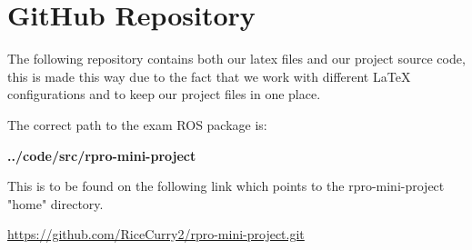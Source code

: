 \chapter{GitHub Repository}

The following repository contains both our latex files and our project source code, this is made this way due to the fact that we work with different LaTeX configurations and to keep our project files in one place.

\vspace{2mm}

The correct path to the exam ROS package is:

\vspace{2mm}

\textbf{../code/src/rpro-mini-project}

\vspace{8mm}

This is to be found on the following link which points to the rpro-mini-project "home" directory.

\vspace{4mm}

\href{https://github.com/RiceCurry2/rpro-mini-project.git}{https://github.com/RiceCurry2/rpro-mini-project.git}